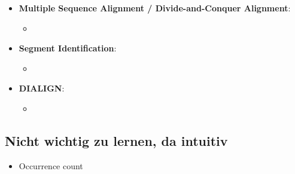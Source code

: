 \begin{itemize}
\begin{itemize}
        \item {}
    \end{itemize}
    \item \textbf{Multiple Sequence Alignment / Divide-and-Conquer Alignment}:
    \begin{itemize}
        \item {}
    \end{itemize}
    \item \textbf{Segment Identification}:
    \begin{itemize}
        \item {}
    \end{itemize}
    \item \textbf{DIALIGN}:
    \begin{itemize}
        \item {}
    \end{itemize}
\end{itemize}

\subsection*{Nicht wichtig zu lernen, da intuitiv}
\begin{itemize}
    \item Occurrence count
\end{itemize}